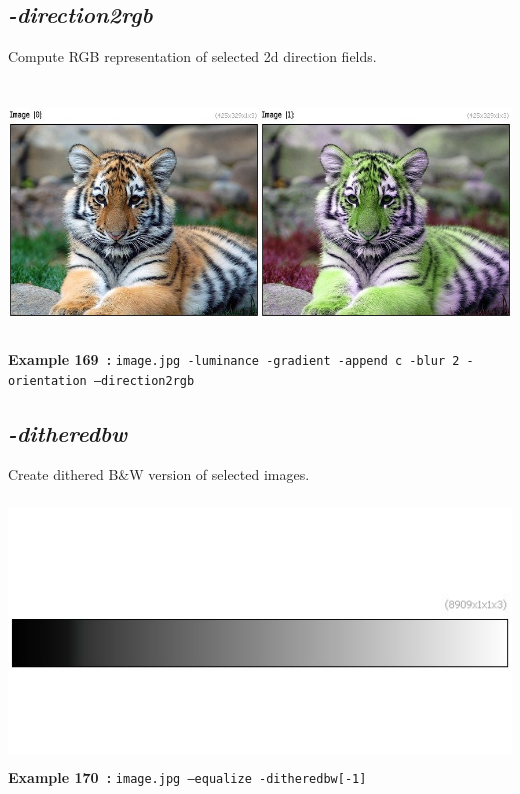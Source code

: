 \documentclass[a4paper,11pt,twoside]{book}
\begin{document}
\subsection{\emph{-direction2rgb} }\vspace*{-0.5em}
Compute RGB representation of selected 2d direction fields.
\begin{center}\includegraphics[keepaspectratio=true,height=7cm,width=\textwidth]{img/gmic_def169.jpg}\\
{\footnotesize \textbf{Example 169~:} \texttt{image.jpg -luminance -gradient -append c -blur 2 -orientation --direction2rgb}}
\end{center}

\subsection{\emph{-ditheredbw} }\vspace*{-0.5em}
Create dithered B\&W version of selected images.
\begin{center}\includegraphics[keepaspectratio=true,height=7cm,width=\textwidth]{img/gmic_def170.jpg}\\
{\footnotesize \textbf{Example 170~:} \texttt{image.jpg --equalize -ditheredbw[-1]}}
\end{center}
\end{document}
